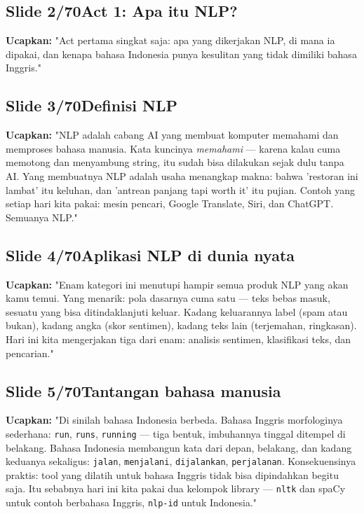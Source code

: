 \documentclass[11pt]{article}
\renewcommand{\framebox}[1]{\colorbox{acc!15}{\textcolor{acc}{\textbf{#1}}}}
\begin{document}
\subsection*{\framebox{Slide 2/70}\quad Act 1: Apa itu NLP?}
\textbf{Ucapkan:} "Act pertama singkat saja: apa yang dikerjakan NLP, di mana ia dipakai, dan kenapa bahasa Indonesia punya kesulitan yang tidak dimiliki bahasa Inggris."\\[2pt]

\subsection*{\framebox{Slide 3/70}\quad Definisi NLP}
\textbf{Ucapkan:} "NLP adalah cabang AI yang membuat komputer memahami dan memproses bahasa manusia. Kata kuncinya \emph{memahami} — karena kalau cuma memotong dan menyambung string, itu sudah bisa dilakukan sejak dulu tanpa AI. Yang membuatnya NLP adalah usaha menangkap makna: bahwa 'restoran ini lambat' itu keluhan, dan 'antrean panjang tapi worth it' itu pujian. Contoh yang setiap hari kita pakai: mesin pencari, Google Translate, Siri, dan ChatGPT. Semuanya NLP."\\[2pt]

\subsection*{\framebox{Slide 4/70}\quad Aplikasi NLP di dunia nyata}
\textbf{Ucapkan:} "Enam kategori ini menutupi hampir semua produk NLP yang akan kamu temui. Yang menarik: pola dasarnya cuma satu — teks bebas masuk, sesuatu yang bisa ditindaklanjuti keluar. Kadang keluarannya label (spam atau bukan), kadang angka (skor sentimen), kadang teks lain (terjemahan, ringkasan). Hari ini kita mengerjakan tiga dari enam: analisis sentimen, klasifikasi teks, dan pencarian."\\[2pt]

\subsection*{\framebox{Slide 5/70}\quad Tantangan bahasa manusia}
\textbf{Ucapkan:} "Di sinilah bahasa Indonesia berbeda. Bahasa Inggris morfologinya sederhana: \texttt{run}, \texttt{runs}, \texttt{running} — tiga bentuk, imbuhannya tinggal ditempel di belakang. Bahasa Indonesia membangun kata dari depan, belakang, dan kadang keduanya sekaligus: \texttt{jalan}, \texttt{menjalani}, \texttt{dijalankan}, \texttt{perjalanan}. Konsekuensinya praktis: tool yang dilatih untuk bahasa Inggris tidak bisa dipindahkan begitu saja. Itu sebabnya hari ini kita pakai dua kelompok library — \texttt{nltk} dan spaCy untuk contoh berbahasa Inggris, \texttt{nlp-id} untuk Indonesia."\\[2pt]
\end{document}

